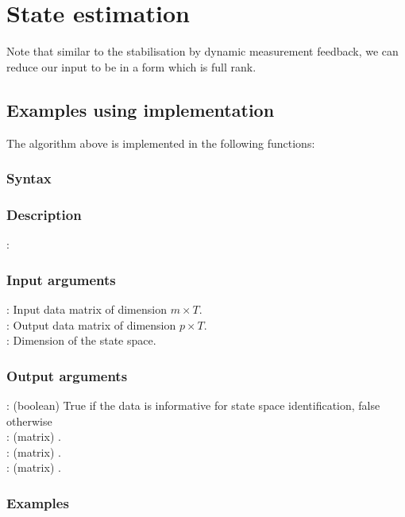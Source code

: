 \section{State estimation}






Note that similar to the stabilisation by dynamic measurement feedback, we can reduce our input to be in a form which is full rank.












\subsection{Examples using implementation}
The algorithm above is implemented in the following functions:
\subsubsection*{Syntax}

\subsubsection*{Description}
: 

\subsubsection*{Input arguments}
\textbf{}: Input data matrix of dimension $m \times T$.\\
\textbf{}: Output data matrix of dimension $p \times T$.\\
\textbf{}: Dimension of the state space.

\subsubsection*{Output arguments}
\textbf{}: (boolean) True if the data is informative for state space identification, false otherwise\\
\textbf{}: (matrix) .\\
\textbf{}: (matrix) .\\
\textbf{}: (matrix) .

\subsubsection{Examples}